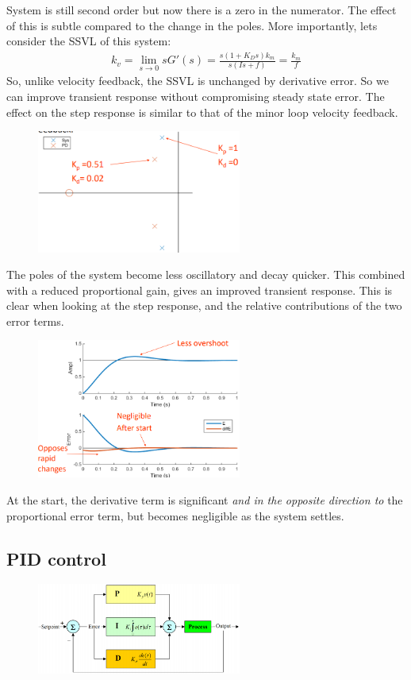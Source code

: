 \documentclass[class=report, crop=false, 12pt,a4paper]{standalone}
\begin{document}
System is still second order but now there is a zero in the numerator. The effect of this is subtle compared to the change in the poles. More importantly, lets consider the SSVL of this system:
\begin{align}
  k_v = \lim_{s\rightarrow 0} s G'(s) = \frac{s \left( 1+K_D s\right) k_m}{s\left( Is + f \right)} = \frac{k_m}{f}
\end{align}
So, unlike velocity feedback, the SSVL is unchanged by derivative error. So we can improve transient response without compromising steady state error. The effect on the step response is similar to that of the minor loop velocity feedback.
\begin{figure}[H]
  \centerline{\includegraphics[width = 0.6\textwidth]{../img/diagram123.png}}
  \caption{}
\end{figure}
The poles of the system become less oscillatory and decay quicker. This combined with a reduced proportional gain, gives an improved transient response. This is clear when looking at the step response, and the relative contributions of the two error terms.
\begin{figure}[H]
  \centerline{\includegraphics[width = 0.6\textwidth]{../img/diagram124.png}}
  \caption{}
\end{figure}
At the start, the derivative term is significant \textit{and in the opposite direction to} the proportional error term, but becomes negligible as the system settles.
\subsection{PID control}
\begin{figure}[H]
  \centerline{\includegraphics[width = 0.6\textwidth]{../img/diagram125.png}}
  \caption{}
\end{figure}
\end{document}
